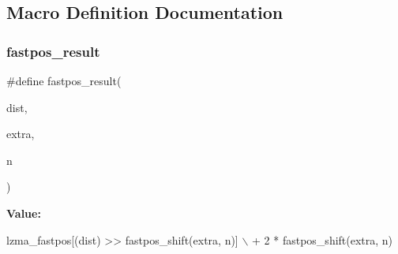 \subsection{Macro Definition Documentation}
\mbox{\label{fastpos_8h_a7e84a834fdc6fc1119609fc5f2cd0fca}} 
\subsubsection{fastpos\+\_\+result}
{\footnotesize\ttfamily \#define fastpos\+\_\+result(\begin{DoxyParamCaption}\item[{}]{dist,  }\item[{}]{extra,  }\item[{}]{n }\end{DoxyParamCaption})}

{\bfseries Value\+:}
\begin{DoxyCode}
lzma\_fastpos[(dist) >> fastpos\_shift(extra, n)] \(\backslash\)
                        + 2 * fastpos\_shift(extra, n)
\end{DoxyCode}

